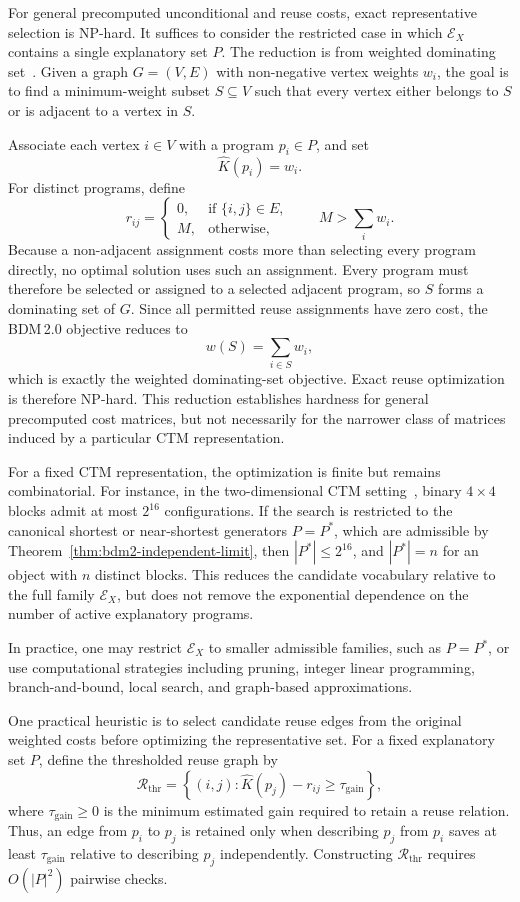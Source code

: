 \documentclass{article}
\begin{document}
For general precomputed unconditional and reuse costs, exact representative selection is NP-hard. It suffices to consider the restricted case in which \(\mathcal E_X\) contains a single explanatory set \(P\). The reduction is from weighted dominating set~\cite{garey_computers_1979}. Given a graph \(G=(V,E)\) with non-negative vertex weights \(w_i\), the goal is to find a minimum-weight subset \(S\subseteq V\) such that every vertex either belongs to \(S\) or is adjacent to a vertex in \(S\).

Associate each vertex \(i\in V\) with a program \(p_i\in P\), and set
\[
\hat K(p_i)=w_i.
\]
For distinct programs, define
\[
r_{ij}
=
\begin{cases}
0, & \text{if } \{i,j\}\in E,\\
M, & \text{otherwise},
\end{cases}
\qquad
M>\sum_i w_i.
\]
Because a non-adjacent assignment costs more than selecting every program directly, no optimal solution uses such an assignment. Every program must therefore be selected or assigned to a selected adjacent program, so \(S\) forms a dominating set of \(G\). Since all permitted reuse assignments have zero cost, the BDM\,2.0 objective reduces to
\[
w(S)=\sum_{i\in S}w_i,
\]
which is exactly the weighted dominating-set objective. Exact reuse optimization is therefore NP-hard. This reduction establishes hardness for general precomputed cost matrices, but not necessarily for the narrower class of matrices induced by a particular CTM representation.

For a fixed CTM representation, the optimization is finite but remains combinatorial. For instance, in the two-dimensional CTM setting~\cite{zenil_two-dimensional_2015}, binary \(4\times4\) blocks admit at most \(2^{16}\) configurations. If the search is restricted to the canonical shortest or near-shortest generators \(P=P^*\), which are admissible by Theorem~\ref{thm:bdm2-independent-limit}, then \(|P^*|\leq2^{16}\), and \(|P^*|=n\) for an object with \(n\) distinct blocks. This reduces the candidate vocabulary relative to the full family \(\mathcal E_X\), but does not remove the exponential dependence on the number of active explanatory programs.

In practice, one may restrict \(\mathcal E_X\) to smaller admissible families, such as \(P=P^*\), or use computational strategies including pruning, integer linear programming, branch-and-bound, local search, and graph-based approximations.

One practical heuristic is to select candidate reuse edges from the original weighted costs before optimizing the representative set. For a fixed explanatory set \(P\), define the thresholded reuse graph by
\[
\mathcal R_{\mathrm{thr}}
=
\left\{
(i,j):
\hat K(p_j)-r_{ij}\geq\tau_{\mathrm{gain}}
\right\},
\]
where \(\tau_{\mathrm{gain}}\geq0\) is the minimum estimated gain required to retain a reuse relation. Thus, an edge from \(p_i\) to \(p_j\) is retained only when describing \(p_j\) from \(p_i\) saves at least \(\tau_{\mathrm{gain}}\) relative to describing \(p_j\) independently. Constructing \(\mathcal R_{\mathrm{thr}}\) requires \(O(|P|^2)\) pairwise checks.
\end{document}
